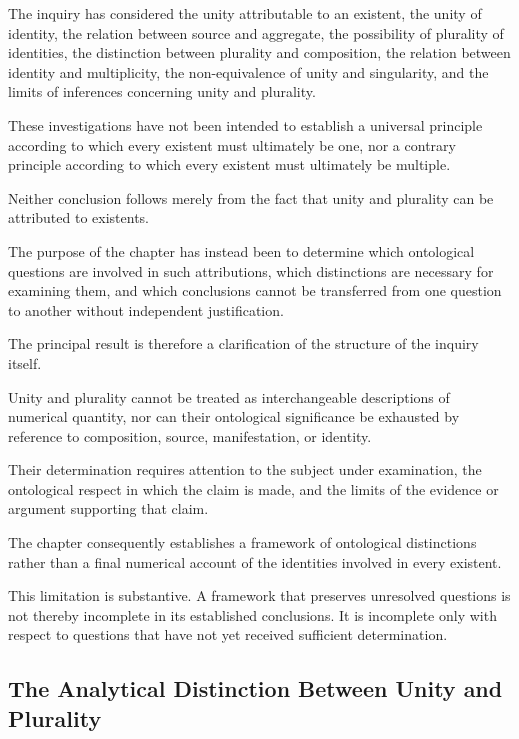 The inquiry has considered the unity
attributable to an existent, the unity
of identity, the relation between source
and aggregate, the possibility of
plurality of identities, the distinction
between plurality and composition,
the relation between identity and
multiplicity, the non-equivalence of
unity and singularity, and the limits
of inferences concerning unity and
plurality.

These investigations have not been
intended to establish a universal
principle according to which every
existent must ultimately be one,
nor a contrary principle according
to which every existent must ultimately
be multiple.

Neither conclusion follows merely
from the fact that unity and plurality
can be attributed to existents.

The purpose of the chapter has instead
been to determine which ontological
questions are involved in such
attributions, which distinctions are
necessary for examining them, and
which conclusions cannot be transferred
from one question to another without
independent justification.

The principal result is therefore
a clarification of the structure of
the inquiry itself.

Unity and plurality cannot be treated
as interchangeable descriptions of
numerical quantity, nor can their
ontological significance be exhausted
by reference to composition, source,
manifestation, or identity.

Their determination requires attention
to the subject under examination,
the ontological respect in which
the claim is made, and the limits
of the evidence or argument supporting
that claim.

The chapter consequently establishes
a framework of ontological distinctions
rather than a final numerical account
of the identities involved in every
existent.

This limitation is substantive.
A framework that preserves unresolved
questions is not thereby incomplete
in its established conclusions.
It is incomplete only with respect
to questions that have not yet received
sufficient determination.

\subsection{The Analytical Distinction Between Unity and Plurality}

